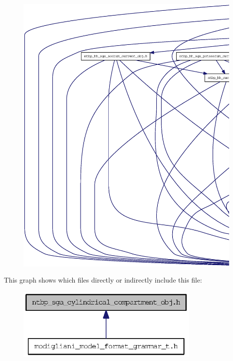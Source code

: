 \begin{figure}[H]
\begin{center}
\leavevmode
\includegraphics[width=400pt]{ntbp__sga__cylindrical__compartment__obj_8h__incl}
\end{center}
\end{figure}
This graph shows which files directly or indirectly include this file:
\nopagebreak
\begin{figure}[H]
\begin{center}
\leavevmode
\includegraphics[width=256pt]{ntbp__sga__cylindrical__compartment__obj_8h__dep__incl}
\end{center}
\end{figure}
